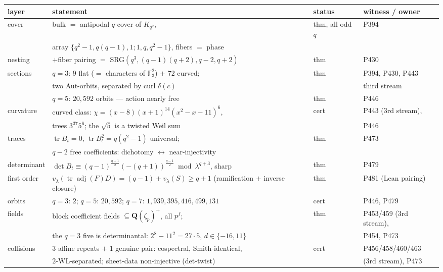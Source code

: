 \documentclass[11pt]{article}
\newcommand{\FF}{\mathbb F}
\begin{document}
\begin{center}
\begin{tabular}{@{}llll@{}}
\toprule
layer & statement & status & witness / owner \\
\midrule
cover & bulk $=$ antipodal $q$-cover of $K_{q^2}$, & thm, all odd $q$ & P394 \\
      & array $\{q^2{-}1,q(q{-}1),1;1,q,q^2{-}1\}$, fibers $=$ phase & & \\
nesting & $+$fiber pairing $=$ SRG$(q^3,(q{-}1)(q{+}2),q{-}2,q{+}2)$ & thm & P430 \\
sections & $q{=}3$: $9$ flat ($=$ characters of $\FF_3^2$) $+$ $72$ curved; & thm & P394, P430, P443 \\
         & two Aut-orbits, separated by curl $\delta(c)$ & & third stream \\
         & $q{=}5$: $20{,}592$ orbits --- action nearly free & thm & P446 \\
curvature & curved class: $\chi=(x{-}8)(x{+}1)^{14}(x^2{-}x{-}11)^6$, & cert & P443 (3rd stream), \\
          & trees $3^{37}5^6$; the $\sqrt5$ is a twisted Weil sum & & P446 \\
traces & $\operatorname{tr}B_t=0$, $\operatorname{tr}B_t^2=q(q^2{-}1)$ universal; & thm & P473 \\
       & $q{-}2$ free coefficients: dichotomy $\leftrightarrow$ near-injectivity & & \\
determinant & $\det B_t\equiv(q{-}1)^{\frac{q+1}2}(-(q{+}1))^{\frac{q-1}2}
              \bmod\lambda^{q+3}$, sharp & thm & P479 \\
first order & $v_\lambda(\operatorname{tr}\operatorname{adj}(F)D)=(q{-}1)+v_\lambda(S)\ge q{+}1$
              (ramification $+$ inverse closure) & thm & P481 (Lean pairing) \\
orbits & $q{=}3{:}\,2$; $q{=}5{:}\,20{,}592$; $q{=}7{:}\,1{,}939{,}395{,}416{,}499{,}131$ & cert & P446, P479 \\
fields & block coefficient fields $\subseteq\mathbf Q(\zeta_p)^+$, all $p^f$; & thm & P453/459 (3rd stream), \\
       & the $q{=}3$ five is determinantal: $2^8-11^2=27\cdot5$, $d\in\{-16,11\}$ & & P454, P473 \\
collisions & $3$ affine repeats $+$ $1$ genuine pair: cospectral, Smith-identical, & cert & P456/458/460/463 \\
           & $2$-WL-separated; sheet-data non-injective (det-twist) & & (3rd stream), P473 \\

\end{tabular}
\end{center}
\end{document}
